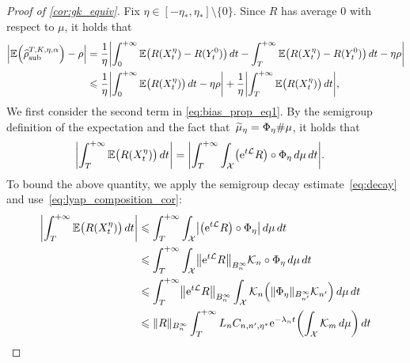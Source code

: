 \begin{proof}[Proof of \cref{cor:gk_equiv}]
	Fix $\eta \in [-\eta_*, \eta_*] \setminus \{0\}$. Since $R$ has average 0 with respect to $\mu$, it holds that
	\begin{align}
		\left|\E\paren*{\aTSest} - \rho\right| &= \frac{1}{\eta}\abs*{\int_0^{+\infty} \E\bigl(R(X^\eta_t) - R(Y^0_t)\bigr) \, dt - \int_T^{+\infty} \E\bigl(R(X^\eta_t) - R(Y^0_t)\bigr) \, dt - \eta\rho} \\
		&\leq \frac{1}{\eta}\abs*{\int_0^{+\infty} \E\bigl(R(X^\eta_t)\bigr) \, dt - \eta\rho} + \frac{1}{\eta}\abs*{\int_T^{+\infty} \E\bigl(R(X^\eta_t)\bigr) \, dt},
		\label{eq:bias_prop_eq1}
	\end{align}
	 We first consider the second term in \eqref{eq:bias_prop_eq1}. By the semigroup definition of the expectation and the fact that~$\widetilde{\mu}_\eta = \Phi_\eta\#\mu$, it holds that
	\begin{align}
		\abs*{\int_T^{+\infty} \E\bigl(R(X^\eta_t)\bigr) \, dt} &= \abs*{\int_T^{+\infty} \int_\mathcal{X} \bigl(\e^{t\L} R\bigr) \circ \Phi_\eta \, d\mu \, dt}.
		\label{eq:trunc_bias_eq}
	\end{align}
To bound the above quantity, we apply the semigroup decay estimate~\eqref{eq:decay} and use~\eqref{eq:lyap_composition_cor}: 
	\begin{align}
		\abs*{\int_T^{+\infty} \E\bigl(R(X^\eta_t)\bigr) \, dt} &\leq \int_T^{+\infty} \int_\mathcal{X} \abs*{\bigl(\e^{t\L} R\bigr) \circ \Phi_\eta} \, d\mu \, dt \\
		&\leq \int_T^{+\infty} \int_\mathcal{X} \norm*{\e^{t\L} R}_{B^\infty_n} \mathcal{K}_n \circ \Phi_\eta \, d\mu \, dt \\
		&\leq \int_T^{+\infty} \norm*{\e^{t\L} R}_{B^\infty_n} \int_\mathcal{X} \mathcal{K}_n\paren*{\norm{\Phi_\eta}_{B^\infty_{n'}} \mathcal{K}_{n'}} \, d\mu \, dt \\
		&\leq \norm{R}_{B^\infty_n}\int_T^{+\infty} L_n C_{n,n',\eta^*} \e^{-\lambda_n t} \paren*{\int_\mathcal{X} \mathcal{K}_m \, d\mu} \, dt \\

\end{align}
\end{proof}
